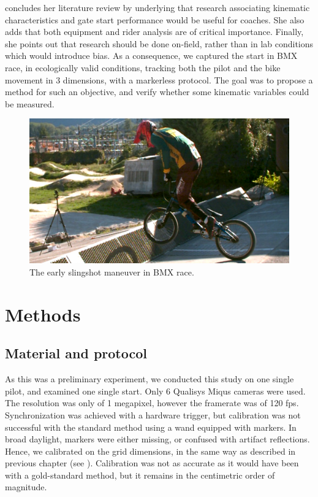 \cite{Grigg2017} concludes her literature review by underlying that research associating kinematic characteristics and gate start performance would be useful for coaches. She also adds that both equipment and rider analysis are of critical importance. Finally, she points out that research should be done on-field, rather than in lab conditions which would introduce bias. As a consequence, we captured the start in BMX race, in ecologically valid conditions, tracking both the pilot and the bike movement in 3 dimensions, with a markerless protocol. The goal was to propose a method for such an objective, and verify whether some kinematic variables could be measured.

\begin{figure}[hbtp]
	\centering
	\def\svgwidth{1\columnwidth}
	\fontsize{10pt}{10pt}\selectfont
	\includegraphics[width=\linewidth]{"../Chap7/Figures/BMXStart.PNG"}
	\caption{The early slingshot maneuver in BMX race.}
	\label{fig_bmxstart}
\end{figure}


\section{Methods}

\subsection{Material and protocol}
As this was a preliminary experiment, we conducted this study on one single pilot, and examined one single start. Only 6 Qualisys Miqus cameras were used. The resolution was only of 1 megapixel, however the framerate was of 120 fps. Synchronization was achieved with a hardware trigger, but calibration was not successful with the standard method using a wand equipped with markers. In broad daylight, markers were either missing, or confused with artifact reflections. Hence, we calibrated on the grid dimensions, in the same way as described in previous chapter (see ). Calibration was not as accurate as it would have been with a gold-standard method, but it remains in the centimetric order of magnitude.

